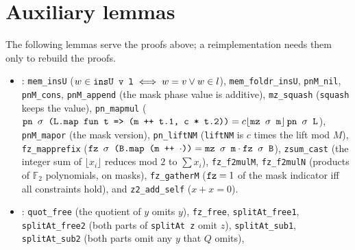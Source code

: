 \section{Auxiliary lemmas}\label{sec:lean-pathsum-aux}

The following lemmas serve the proofs above; a reimplementation needs them only to rebuild the
proofs.
\begin{itemize}
\item {}: \textnormal{\texttt{mem\_\allowbreak{}insU}} ($w\in\textnormal{\texttt{insU v l}}\iff w=v\vee w\in l$),
  \textnormal{\texttt{mem\_\allowbreak{}foldr\_\allowbreak{}insU}}, \textnormal{\texttt{pnM\_\allowbreak{}nil}}, \textnormal{\texttt{pnM\_\allowbreak{}cons}}, \textnormal{\texttt{pnM\_\allowbreak{}append}} (the mask phase value
  is additive), \textnormal{\texttt{mz\_\allowbreak{}squash}} (\textnormal{\texttt{squash}} keeps the value), \textnormal{\texttt{pn\_\allowbreak{}mapmul}}
  ($\textnormal{\texttt{pn \ensuremath{\sigma} (\allowbreak{}L.\allowbreak{}map fun t => (\allowbreak{}m ++ t.\allowbreak{}1,\allowbreak{} c * t.\allowbreak{}2))}} = c\lfloor\textnormal{\texttt{mz \ensuremath{\sigma} m}}\rfloor\,\textnormal{\texttt{pn \ensuremath{\sigma} L}}$),
  \textnormal{\texttt{pnM\_\allowbreak{}mapor}} (the mask version), \textnormal{\texttt{pn\_\allowbreak{}liftNM}} (\textnormal{\texttt{liftNM}} is $c$ times the lift mod
  $M$), \textnormal{\texttt{fz\_\allowbreak{}mapprefix}} ($\textnormal{\texttt{fz \ensuremath{\sigma} (\allowbreak{}B.\allowbreak{}map (\allowbreak{}m ++ \ensuremath{\cdot}))}} = \textnormal{\texttt{mz \ensuremath{\sigma} m}}\cdot\textnormal{\texttt{fz \ensuremath{\sigma} B}}$),
  \textnormal{\texttt{zsum\_\allowbreak{}cast}} (the integer sum of $\lfloor x_i\rfloor$ reduces mod $2$ to $\sum x_i$),
  \textnormal{\texttt{fz\_\allowbreak{}f2mulM}}, \textnormal{\texttt{fz\_\allowbreak{}f2mulN}} (products of $\mathbb F_2$ polynomials, on masks),
  \textnormal{\texttt{fz\_\allowbreak{}gatherM}} ($\textnormal{\texttt{fz}} = 1$ of the mask indicator iff all constraints hold), and
  \textnormal{\texttt{z2\_\allowbreak{}add\_\allowbreak{}self}} ($x+x=0$).
\item {}: \textnormal{\texttt{quot\_\allowbreak{}free}} (the quotient of $y$ omits $y$), \textnormal{\texttt{fz\_\allowbreak{}free}},
  \textnormal{\texttt{splitAt\_\allowbreak{}free1}}, \textnormal{\texttt{splitAt\_\allowbreak{}free2}} (both parts of \textnormal{\texttt{splitAt z}} omit $z$),
  \textnormal{\texttt{splitAt\_\allowbreak{}sub1}}, \textnormal{\texttt{splitAt\_\allowbreak{}sub2}} (both parts omit any $y$ that $Q$ omits),

\end{itemize}
